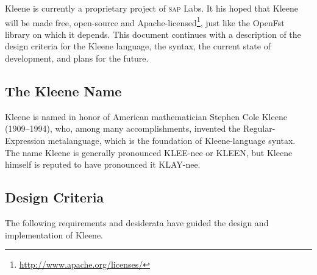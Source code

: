 \documentclass[letterpaper,12pt]{article}
\newcommand{\Kleene}{Kleene\xspace}
\newcommand{\acro}{\textsc}
\begin{document}
\Kleene{} is currently a proprietary project of \acro{sap} Labs.  It his hoped that \Kleene{} will be made
free, open-source and
Apache-licensed\footnote{\url{http://www.apache.org/licenses/}}, just like the OpenFst
library on which it depends.
This document continues with a description of the design criteria for
the \Kleene{} language, the syntax, the current state of 
development, and plans for the future.

\subsection{The Kleene Name}

Kleene is named in honor of American mathematician Stephen Cole Kleene
(1909--1994), who, among many accomplishments, invented the
Regular-Expression metalanguage, which is the foundation of
Kleene-language syntax.  The name Kleene is generally pronounced KLEE-nee
or KLEEN, but Kleene himself is reputed to have pronounced it KLAY-nee.

\subsection{Design Criteria}

The following requirements and desiderata have guided the design and
implementation of \Kleene{}. 
\end{document}
